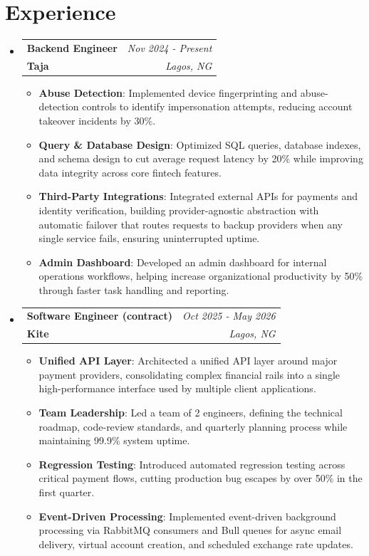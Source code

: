 \documentclass[a4paper,20pt]{article}
\makeatletter
\newcommand{\resumeItem}[2]{
  \item\small{
    \textbf{#1}{: #2}
  }
}
\newcommand{\resumeJobHeading}[4]{ %
  \vspace{4pt}\item[]
    \begin{tabular*}{0.97\textwidth}{l@{\extracolsep{\fill}}r}
      \textbf{#1} & \textit{#3} \\
      \textbf{#4} & \textit{#2} \\
    \end{tabular*}
    \vspace{0pt}
}
\newcommand{\resumeSubHeadingListStart}{\begin{itemize}[leftmargin=*,topsep=4pt]}
\newcommand{\resumeSubHeadingListEnd}{\end{itemize}}
\newcommand{\resumeItemListStart}{\begin{itemize}[topsep=0pt,itemsep=0pt,parsep=0pt]}
\newcommand{\resumeItemListEnd}{\end{itemize}}
\makeatother
\begin{document}
\section{Experience}
  \resumeSubHeadingListStart
    \resumeJobHeading{Backend Engineer}{Lagos, NG}{Nov 2024 - Present}{Taja}
    \resumeItemListStart
        \resumeItem{Abuse Detection}
          {Implemented device fingerprinting and abuse-detection controls to identify impersonation attempts, reducing account takeover incidents by 30\%.}
        \resumeItem{Query \& Database Design}
          {Optimized SQL queries, database indexes, and schema design to cut average request latency by 20\% while improving data integrity across core fintech features.}
        \resumeItem{Third-Party Integrations}
          {Integrated external APIs for payments and identity verification, building provider-agnostic abstraction with automatic failover that routes requests to backup providers when any single service fails, ensuring uninterrupted uptime.}
        \resumeItem{Admin Dashboard}
          {Developed an admin dashboard for internal operations workflows, helping increase organizational productivity by 50\% through faster task handling and reporting.}
      \resumeItemListEnd
    \resumeJobHeading{Software Engineer (contract)}{Lagos, NG}{Oct 2025 - May 2026}{Kite}
    \resumeItemListStart
        \resumeItem{Unified API Layer}
          {Architected a unified API layer around major payment providers, consolidating complex financial rails into a single high-performance interface used by multiple client applications.}
        \resumeItem{Team Leadership}
          {Led a team of 2 engineers, defining the technical roadmap, code-review standards, and quarterly planning process while maintaining 99.9\% system uptime.}
        \resumeItem{Regression Testing}
          {Introduced automated regression testing across critical payment flows, cutting production bug escapes by over 50\% in the first quarter.}
        \resumeItem{Event-Driven Processing}
          {Implemented event-driven background processing via RabbitMQ consumers and Bull queues for async email delivery, virtual account creation, and scheduled exchange rate updates.}
      \resumeItemListEnd

\resumeSubHeadingListEnd

\end{document}

